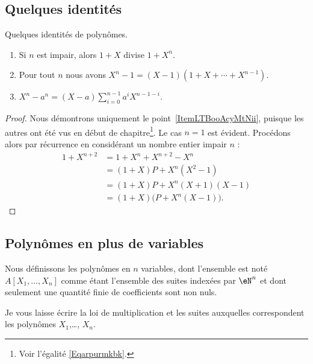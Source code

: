 \subsection{Quelques identités}

\begin{lemma}   \label{LemISPooHIKJBU}
    Quelques identités de polynômes.
    \begin{enumerate}
        \item   \label{ItemLTBooAcyMtN}
            Si \( n\) est impair, alors \( 1+X\) divise \( 1+X^n\).
        \item\label{ItemLTBooAcyMtNii}
            Pour tout \( n\) nous avons \( X^n-1=(X-1)(1+X+\cdots +X^{n-1})\).
        \item
            \( X^n-a^n=(X-a)\sum_{i=0}^{n-1}a^iX^{n-1-i}\).
    \end{enumerate}
\end{lemma}

\begin{proof}
  Nous démontrons uniquement le point~\ref{ItemLTBooAcyMtNii}, puisque
  les autres ont été vus en début de chapitre\footnote{Voir l'égalité
    \eqref{Eqarpurmkbk}.}. Le cas \( n=1\) est évident. Procédons
  alors par récurrence en considérant un nombre entier impair \( n\) :
    \begin{subequations}
        \begin{align}
            1+X^{n+2}&=1+X^n+X^{n+2}-X^n\\
                    &=(1+X)P+X^n(X^2-1)\\
                    &=(1+X)P+X^n(X+1)(X-1)\\
                    &=(1+X)\big( P+X^n(X-1) \big).
        \end{align}
    \end{subequations}
\end{proof}

\subsection{Polynômes en plus de variables}

\begin{definition}      \label{DEFooZNHOooCruuwI}
    Nous définissons les polynômes en \( n\) variables, dont l'ensemble est noté \( A[X_1,\ldots, X_n]\) comme étant l'ensemble des suites indexées par \( \eN^n\) et dont seulement une quantité finie de coefficients sont non nuls.
\end{definition}

Je vous laisse écrire la loi de multiplication et les suites auxquelles correspondent les polynômes \( X_1\),\ldots,  \( X_n\).

